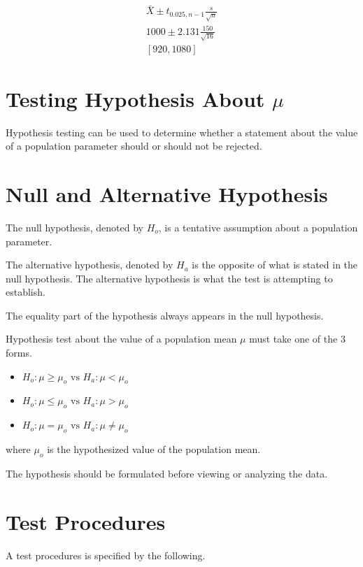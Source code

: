 \documentclass{article}
\begin{document}
    \begin{align*}
        \bar{X} \pm t_{0.025, n-1}\frac{s}{\sqrt{n}}\\
        1000 \pm 2.131 \frac{150}{\sqrt{16}}\\
        [920, 1080]
    \end{align*}

    \section*{Testing Hypothesis About $\mu$}
    Hypothesis testing can be used to determine whether 
    a statement about the value of a population parameter should or 
    should not be rejected.

    \section*{Null and Alternative Hypothesis}
    The null hypothesis, denoted by $H_{o}$, is a tentative assumption 
    about a population parameter.\par

    The alternative hypothesis, denoted by $H_{a}$ is the opposite of what is 
    stated in the null hypothesis. 
    The alternative hypothesis is what the test is attempting to establish. \par
    
    The equality part of the hypothesis always appears in the null hypothesis.\par

    Hypothesis test about the value of a population mean 
    $\mu$ must take one of the 3 forms.

    \begin{itemize}
        \item $H_{o}: \mu \geq \mu_{o} \text{ vs } H_{a}: \mu < \mu_{o}$
        \item $H_{o}: \mu \leq \mu_{o} \text{ vs } H_{a}: \mu > \mu_{o}$
        \item $H_{o}: \mu = \mu_{o} \text{ vs } H_{a}: \mu \neq \mu_{o}$
    \end{itemize}
    where $\mu_{o}$ is the hypothesized value of the population mean.\par

    The hypothesis should be formulated before viewing or analyzing the data.

    \section*{Test Procedures}
    A test procedures is specified by the following.
\end{document}
